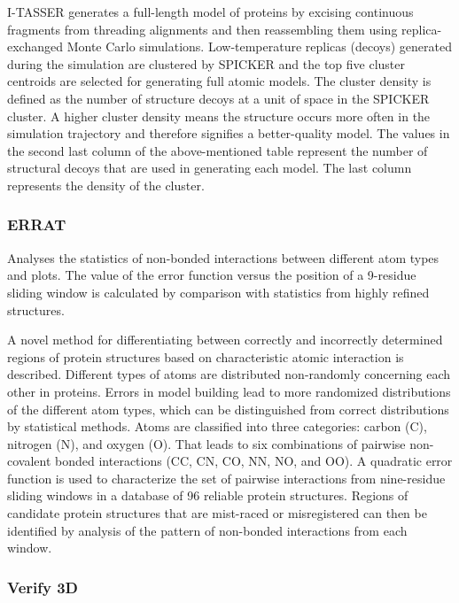 \documentclass[11pt, letterpaper, english]{article}
\begin{document}
    \par{I-TASSER generates a full-length model of proteins by excising continuous fragments from threading alignments and then reassembling them using replica-exchanged Monte Carlo simulations. Low-temperature replicas (decoys) generated during the simulation are clustered by SPICKER and the top five cluster centroids are selected for generating full atomic models. The cluster density is defined as the number of structure decoys at a unit of space in the SPICKER cluster. A higher cluster density means the structure occurs more often in the simulation trajectory and therefore signifies a better-quality model. The values in the second last column of the above-mentioned table represent the number of structural decoys that are used in generating each model. The last column represents the density of the cluster.}

\subsubsection{ERRAT}

    \par{Analyses the statistics of non-bonded interactions between different atom types and plots. The value of the error function versus the position of a 9-residue sliding window is calculated by comparison with statistics from highly refined structures.}

    \par{A novel method for differentiating between correctly and incorrectly determined regions of protein structures based on characteristic atomic interaction is described. Different types of atoms are distributed non-randomly concerning each other in proteins. Errors in model building lead to more randomized distributions of the different atom types, which can be distinguished from correct distributions by statistical methods. Atoms are classified into three categories: carbon (C), nitrogen (N), and oxygen (O). That leads to six combinations of pairwise non-covalent bonded interactions (CC, CN, CO, NN, NO, and OO). A quadratic error function is used to characterize the set of pairwise interactions from nine-residue sliding windows in a database of 96 reliable protein structures. Regions of candidate protein structures that are mist-raced or misregistered can then be identified by analysis of the pattern of non-bonded interactions from each window.}

\subsubsection{Verify 3D}
\end{document}

